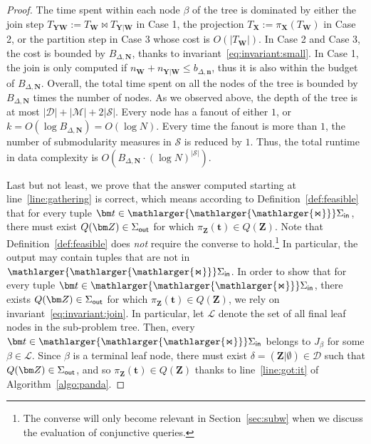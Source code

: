 \documentclass{theoretics}
\newcommand{\calM}{\mathcal M}
\newcommand{\calS}{\mathcal S}
\newcommand{\calD}{\mathcal D}
\newcommand{\calL}{\mathcal L}
\newcommand{\bigjoin}{\mathlarger{\mathlarger{\mathlarger{\Join}}}}
\newcommand{\inn}{\text{\sf in}}
\newcommand{\out}{\text{\sf out}}
\begin{document}
\begin{proof}
  The time spent within each node $\beta$ of the tree is dominated by either
  the join step $T_{\bm Y\bm W}:=T_{\bm W}\Join T_{\bm Y | \bm W}$ in Case 1,
  the projection $T_{\bm X} := \pi_{\bm X}(T_{\bm W})$ in Case 2,
  or the partition step in Case 3 whose cost is $O(|T_{\bm W}|)$.
  In Case 2 and Case 3, the cost is bounded by $B_{\Delta,\bm N}$, thanks to
  invariant~\eqref{eq:invariant:small}.
  In Case 1, the join is only computed if $n_{\bm W}+n_{\bm Y | \bm W}\leq b_{\Delta,\bm n}$,
  thus it is also within the budget of $B_{\Delta,\bm N}$.
  Overall, the total time spent on all the nodes of the tree is bounded by $B_{\Delta,\bm N}$
  times the number of nodes. As we observed above, the depth of the tree is at most
  $|\calD|+|\calM|+2|\calS|$. Every node has a fanout of either $1$, or
  $k = O(\log B_{\Delta,\bm N}) = O(\log N)$.
  Every time the fanout is more than $1$, the number of submodularity measures in
  $\calS$ is reduced by $1$. Thus, the total runtime in data complexity is
  $O(B_{\Delta, \bm N} \cdot (\log N)^{|\calS|})$.

  Last but not least, we prove that the answer computed starting at line~\ref{line:gathering}
  is correct, which means according to Definition~\ref{def:feasible} that for every tuple $\bm t \in \bigjoin \Sigma_\inn$, there must
  exist $Q(\bm Z) \in \Sigma_\out$ for which $\pi_{\bm Z}(\bm t) \in Q(\bm Z)$.
  Note that Definition~\ref{def:feasible} does {\em not} require the converse to hold.\footnote{The converse will only become relevant in Section~\ref{sec:subw} when we discuss the evaluation of conjunctive queries.}
  In particular, the output may contain tuples that are not in $\bigjoin \Sigma_\inn$.
  In order to show that for every tuple $\bm t \in \bigjoin \Sigma_\inn$, there
  exists $Q(\bm Z) \in \Sigma_\out$ for which $\pi_{\bm Z}(\bm t) \in Q(\bm Z)$,
  we rely on invariant~\eqref{eq:invariant:join}.
  In particular, let $\calL$ denote the set of all final leaf nodes in the sub-problem tree.
  Then, every $\bm t \in \bigjoin\Sigma_\inn$ belongs to $J_\beta$ for some $\beta \in \calL$.
  Since $\beta$ is a terminal leaf node, there must exist $\delta = (\bm Z|\emptyset) \in \calD$
  such that $Q(\bm Z) \in \Sigma_\out$, and so $\pi_{\bm Z}(\bm t) \in Q(\bm Z)$
  thanks to line~\ref{line:got:it} of Algorithm~\ref{algo:panda}.
\end{proof}
\end{document}
